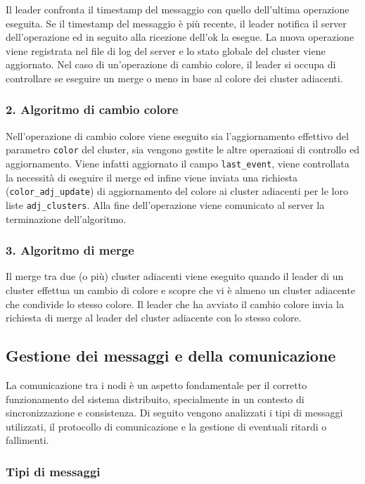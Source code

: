 \documentclass[12pt, a4paper]{report}
\begin{document}
Il leader confronta il timestamp del messaggio con quello dell'ultima operazione eseguita. Se il timestamp del messaggio \`e pi\`u recente, il leader notifica il server dell'operazione ed in seguito alla ricezione dell'ok la esegue. La nuova operazione viene registrata nel file di log del server e lo stato globale del cluster viene aggiornato. Nel caso di un'operazione di cambio colore, il leader si occupa di controllare se eseguire un merge o meno in base al colore dei cluster adiacenti.

\subsubsection{2. Algoritmo di cambio colore}
\label{subsec:change_color}
Nell'operazione di cambio colore viene eseguito sia l'aggiornamento effettivo del parametro \texttt{color} del cluster, sia vengono gestite le altre operazioni di controllo ed aggiornamento. Viene infatti aggiornato il campo \texttt{last\_event}, viene controllata la necessit\`a di eseguire il merge ed infine viene inviata una richiesta (\texttt{color\_adj\_update}) di aggiornamento del colore ai cluster adiacenti per le loro liste \texttt{adj\_clusters}. Alla fine dell'operazione viene comunicato al server la terminazione dell'algoritmo.

\subsubsection{3. Algoritmo di merge}
\label{subsec:merge}
Il merge tra due (o pi\`u) cluster adiacenti viene eseguito quando il leader di un cluster effettua un cambio di colore e scopre che vi \`e almeno un cluster adiacente che condivide lo stesso colore. Il leader che ha avviato il cambio colore invia la richiesta di merge al leader del cluster adiacente con lo stesso colore.

\subsection{Gestione dei messaggi e della comunicazione}\label{sec:gestione_messaggi}

La comunicazione tra i nodi \`e un aspetto fondamentale per il corretto funzionamento del sistema distribuito, specialmente in un contesto di sincronizzazione e consistenza. Di seguito vengono analizzati i tipi di messaggi utilizzati, il protocollo di comunicazione e la gestione di eventuali ritardi o fallimenti.

\newpage
\subsubsection{Tipi di messaggi}
\label{sec:tipi_di_messaggi}
\end{document}
